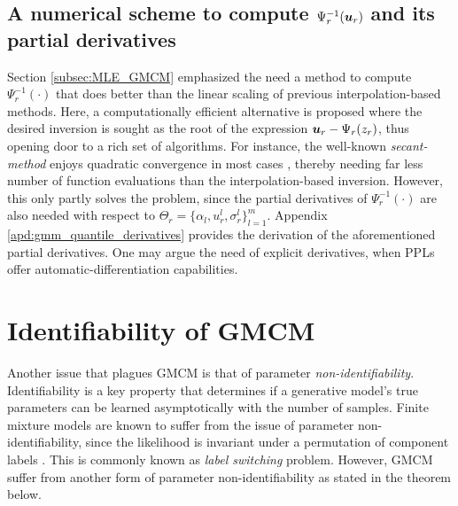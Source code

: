 \documentclass{article}
\theoremstyle{plain}
\theoremstyle{definition}
\theoremstyle{remark}
\begin{document}
\subsection{A numerical scheme to compute $\Psi^{-1}_r(\boldsymbol{u}_r)$ and its partial derivatives} \label{subsec:gmm_quantile}
Section \ref{subsec:MLE_GMCM} emphasized the need a method to compute $\Psi^{-1}_r(\cdot)$ that does better than the linear scaling of previous interpolation-based methods. Here, a computationally efficient alternative is proposed where the desired inversion is sought as the root of the expression $\boldsymbol{u}_r-\Psi_r(z_r)$, thus opening door to a rich set of algorithms. For instance, the well-known \emph{secant-method} enjoys quadratic convergence in most cases \citep{diez2003}, thereby needing far less number of function evaluations than the interpolation-based inversion. However, this only partly solves the problem, since the partial derivatives of $\Psi^{-1}_r(\cdot)$ are also needed with respect to $\Theta_r=\{\alpha_l,u_r^l,\sigma_r^l\}_{l=1}^m$. Appendix \ref{apd:gmm_quantile_derivatives} provides the derivation of the aforementioned partial derivatives. One may argue the need of explicit derivatives, when PPLs offer automatic-differentiation capabilities. 

\section{Identifiability of GMCM}\label{sec:identifiability_GMCM}
Another issue that plagues GMCM is that of parameter \emph{non-identifiability}. Identifiability is a key property that determines if a generative model's true parameters can be learned asymptotically with the number of samples. Finite mixture models are known to suffer from the issue of parameter non-identifiability, since the likelihood is invariant under a permutation of component labels \citep[see][]{Stephens2000}. This is commonly known as \emph{label switching} problem. However, GMCM suffer from another form of parameter non-identifiability as stated in the theorem below.
\end{document}
